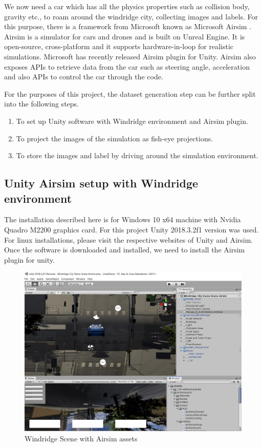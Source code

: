 \documentclass[a4paper, 12pt, oneside, BCOR1cm,toc=chapterentrywithdots]{scrbook}
\begin{document}
We now need a car which has all the physics properties such as collision body, gravity etc., to roam around the windridge city, collecting images and labels. For this purpose, there is a framework from Microsoft known as Microsoft Airsim \cite{airsim2017fsr}. Airsim is a simulator for cars and drones and is built on Unreal Engine. It is open-source, cross-platform and it supports hardware-in-loop for realistic simulations. Microsoft has recently released Airsim plugin for Unity. Airsim also exposes APIs to retrieve data from the car such as steering angle, acceleration and also APIs to control the car through the code. 

For the purposes of this project, the dataset generation step can be further split into the following steps.

\begin{enumerate}
	\item To set up Unity software with Windridge environment and Airsim plugin.
	\item To project the images of the simulation as fish-eye projections.
	\item To store the images and label by driving around the simulation environment.
\end{enumerate}

\subsection{Unity Airsim setup with Windridge environment} \label{instructions}

The installation described here is for Windows 10 x64 machine with Nvidia Quadro M2200 graphics card. For this project Unity 2018.3.2f1 version was used. For linux installations, please visit the respective websites of Unity and Airsim.  Once the software is downloaded and installed, we need to install the Airsim plugin for unity. 


\begin{figure}[h]
\centering
\includegraphics[width=1\textwidth]{WindridgeScene.png}
\caption{Windridge Scene with Airsim assets}
\label{windridgescene}
\end{figure}
\end{document}
